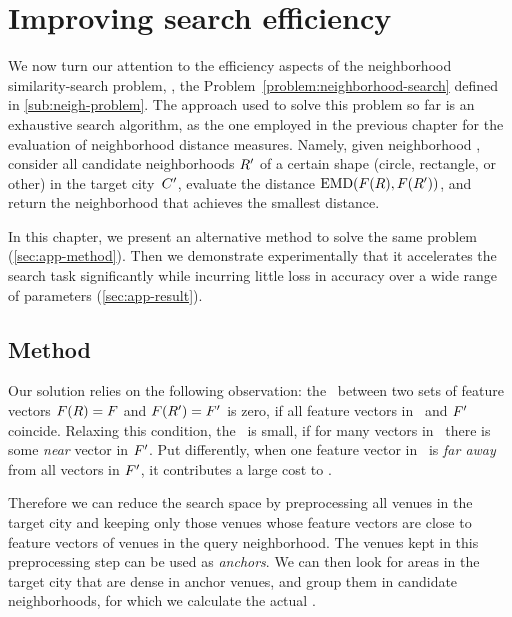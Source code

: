 \chapter{Improving search efficiency}
\label{chap:approx}

We now turn our attention to the efficiency aspects of the neighborhood
similarity-search problem, \ie{}, the Problem~\ref{problem:neighborhood-search}
defined in \autoref{sub:neigh-problem}. The approach used to solve this problem so
far is an exhaustive search algorithm, as the one employed in the previous
chapter for the evaluation of neighborhood distance measures. Namely, given
neighborhood \region, consider all candidate neighborhoods ${R}'$ of a
certain shape (circle, rectangle, or other) in the target city~${C}'$,
evaluate the distance $\mathrm{{EMD}}({F}({R}),{F}({R}'))$, and
return the neighborhood that achieves the smallest distance. 

In this chapter, we present an alternative method to solve the same problem
(\autoref{sec:app-method}). Then we demonstrate experimentally that it
accelerates the search task significantly while incurring little loss in
accuracy over a wide range of parameters (\autoref{sec:app-result}).


\section{Method}
\label{sec:app-method}

Our solution relies on the following observation: the \emd\ between two sets
of feature vectors ${F}({R})={F}$ and ${F}({R}')={F}'$ is zero,
if all feature vectors in \vfvs\ and ${F}'$ coincide. Relaxing this
condition, the \emd\ is small, if for many vectors in \vfvs\ there is some
\emph{near} vector in ${F}'$. Put differently, when one feature vector in \vfvs\
is \emph{far away} from all vectors in ${F}'$, it contributes a large cost to
\emd.

Therefore we can reduce the search space by preprocessing all venues in the
target city and keeping only those venues whose feature vectors are close to
feature vectors of venues in the query neighborhood. The venues kept in this
preprocessing step can be used as \emph{anchors}. We can then look for areas
in the target city that are dense in anchor venues, and group them in candidate
neighborhoods, for which we calculate the actual \emd{}.

\medskip

